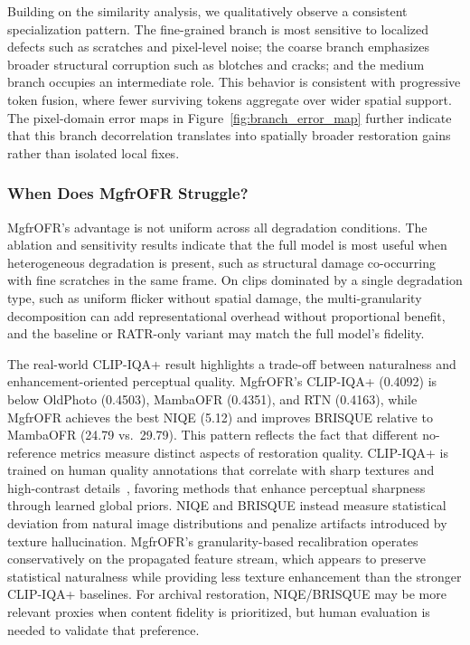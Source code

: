 Building on the similarity analysis, we qualitatively observe a consistent specialization pattern. The fine-grained branch is most sensitive to localized defects such as scratches and pixel-level noise; the coarse branch emphasizes broader structural corruption such as blotches and cracks; and the medium branch occupies an intermediate role. This behavior is consistent with progressive token fusion, where fewer surviving tokens aggregate over wider spatial support. The pixel-domain error maps in Figure~\ref{fig:branch_error_map} further indicate that this branch decorrelation translates into spatially broader restoration gains rather than isolated local fixes.

\subsubsection{When Does MgfrOFR Struggle?}
\label{subsec:failure}

MgfrOFR's advantage is not uniform across all degradation conditions. The ablation and sensitivity results indicate that the full model is most useful when heterogeneous degradation is present, such as structural damage co-occurring with fine scratches in the same frame. On clips dominated by a single degradation type, such as uniform flicker without spatial damage, the multi-granularity decomposition can add representational overhead without proportional benefit, and the baseline or RATR-only variant may match the full model's fidelity.

The real-world CLIP-IQA+ result highlights a trade-off between naturalness and enhancement-oriented perceptual quality. MgfrOFR's CLIP-IQA+ (0.4092) is below OldPhoto (0.4503), MambaOFR (0.4351), and RTN (0.4163), while MgfrOFR achieves the best NIQE (5.12) and improves BRISQUE relative to MambaOFR (24.79 vs.\ 29.79). This pattern reflects the fact that different no-reference metrics measure distinct aspects of restoration quality. CLIP-IQA+ is trained on human quality annotations that correlate with sharp textures and high-contrast details~\cite{wang2023clipiqa}, favoring methods that enhance perceptual sharpness through learned global priors. NIQE and BRISQUE instead measure statistical deviation from natural image distributions and penalize artifacts introduced by texture hallucination. MgfrOFR's granularity-based recalibration operates conservatively on the propagated feature stream, which appears to preserve statistical naturalness while providing less texture enhancement than the stronger CLIP-IQA+ baselines. For archival restoration, NIQE/BRISQUE may be more relevant proxies when content fidelity is prioritized, but human evaluation is needed to validate that preference.

